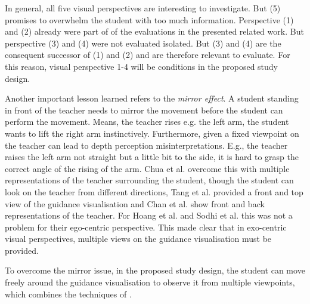 \begin{tcolorbox}[colback=red!30!white]
In general, all five visual perspectives are interesting to investigate. But (5) promises to overwhelm the student with too much information. Perspective (1) and (2) already were part of of the evaluations in the presented related work. But perspective (3) and (4) were not evaluated isolated. But (3) and (4) are the consequent successor of (1) and (2) and are therefore relevant to evaluate. For this reason, visual perspective 1-4 will be conditions in the proposed study design.
\end{tcolorbox}
Another important lesson learned refers to the \textit{mirror effect}. A student standing in front of the teacher needs to mirror the movement before the student can perform the movement. Means, the teacher rises e.g. the left arm, the student wants to lift the right arm instinctively. Furthermore, given a fixed viewpoint on the teacher can lead to depth perception misinterpretations. E.g., the teacher raises the left arm not straight but a little bit to the side, it is hard to grasp the correct angle of the rising of the arm. Chua et al. overcome this with multiple representations of the teacher surrounding the student, though the student can look on the teacher from different directions, Tang et al. provided a front and top view of the guidance visualisation and Chan et al. show front and back representations of the teacher. For Hoang et al. and Sodhi et al. this was not a problem for their ego-centric perspective. This made clear that in exo-centric visual perspectives, multiple views on the guidance visualisation must be provided.
\begin{tcolorbox}[colback=red!30!white]
To overcome the mirror issue, in the proposed study design, the student can move freely around the guidance visualisation to observe it from multiple viewpoints, which combines the techniques of \cite{Chua2003, Hoang2016, Tang2015}.
\end{tcolorbox}
